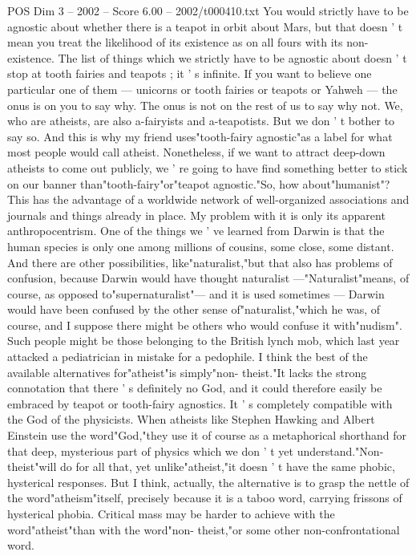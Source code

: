 \begin{textsample}{POS Dim 3 – 2002 – Score 6.00 – 2002/t000410.txt}
You would strictly have to be agnostic about whether there is a teapot in orbit about Mars, but that doesn ' t mean you treat the likelihood of its existence as on all fours with its non-existence.
The list of things which we strictly have to be agnostic about doesn ' t stop at tooth fairies and teapots ; it ' s infinite.
If you want to believe one particular one of them — unicorns or tooth fairies or teapots or Yahweh — the onus is on you to say why.
The onus is not on the rest of us to say why not.
We, who are atheists, are also a-fairyists and a-teapotists.
But we don ' t bother to say so.
And this is why my friend uses"tooth-fairy agnostic"as a label for what most people would call atheist.
Nonetheless, if we want to attract deep-down atheists to come out publicly, we ' re going to have find something better to stick on our banner than"tooth-fairy"or"teapot agnostic."So, how about"humanist"?
This has the advantage of a worldwide network of well-organized associations and journals and things already in place.
My problem with it is only its apparent anthropocentrism.
One of the things we ' ve learned from Darwin is that the human species is only one among millions of cousins, some close, some distant.
And there are other possibilities, like"naturalist,"but that also has problems of confusion, because Darwin would have thought naturalist —"Naturalist"means, of course, as opposed to"supernaturalist"— and it is used sometimes — Darwin would have been confused by the other sense of"naturalist,"which he was, of course, and I suppose there might be others who would confuse it with"nudism".
Such people might be those belonging to the British lynch mob, which last year attacked a pediatrician in mistake for a pedophile.
I think the best of the available alternatives for"atheist"is simply"non- theist."It lacks the strong connotation that there ' s definitely no God, and it could therefore easily be embraced by teapot or tooth-fairy agnostics.
It ' s completely compatible with the God of the physicists.
When atheists like Stephen Hawking and Albert Einstein use the word"God,"they use it of course as a metaphorical shorthand for that deep, mysterious part of physics which we don ' t yet understand."Non-theist"will do for all that, yet unlike"atheist,"it doesn ' t have the same phobic, hysterical responses.
But I think, actually, the alternative is to grasp the nettle of the word"atheism"itself, precisely because it is a taboo word, carrying frissons of hysterical phobia.
Critical mass may be harder to achieve with the word"atheist"than with the word"non- theist,"or some other non-confrontational word.

\end{textsample}
